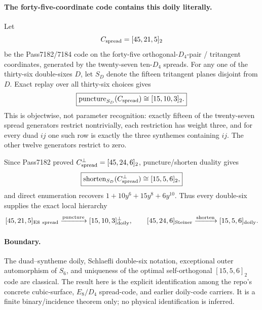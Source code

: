 \paragraph{The forty-five-coordinate code contains this doily literally.}
Let
\[
 C_{\rm spread}=[45,21,5]_2
\]
be the Pass7182/7184 code on the forty-five orthogonal-$D_4$-pair / tritangent coordinates, generated by the twenty-seven ten-$D_4$ spreads.  For any one of the thirty-six double-sixes $D$, let $S_D$ denote the fifteen tritangent planes disjoint from $D$.  Exact replay over all thirty-six choices gives
\[
 \boxed{\operatorname{puncture}_{S_D}(C_{\rm spread})\cong[15,10,3]_2.}
\]
This is objectwise, not parameter recognition: exactly fifteen of the twenty-seven spread generators restrict nontrivially, each restriction has weight three, and for every duad $ij$ one such row is exactly the three synthemes containing $ij$.  The other twelve generators restrict to zero.

Since Pass7182 proved $C_{\rm spread}^{\perp}=[45,24,6]_2$, puncture/shorten duality gives
\[
 \boxed{
 \operatorname{shorten}_{S_D}(C_{\rm spread}^{\perp})
 \cong[15,5,6]_2,
 }
\]
and direct enumeration recovers $1+10y^6+15y^8+6y^{10}$.  Thus every double-six supplies the exact local hierarchy
\[
 [45,21,5]_{\rm E8\ spread}
 \xrightarrow{\rm puncture}
 [15,10,3]_{\rm doily}^{\perp},
 \qquad
 [45,24,6]_{\rm Steiner}
 \xrightarrow{\rm shorten}
 [15,5,6]_{\rm doily}.
\]

\paragraph{Boundary.}
The duad--syntheme doily, Schlaefli double-six notation, exceptional outer automorphism of $S_6$, and uniqueness of the optimal self-orthogonal $[15,5,6]_2$ code are classical.  The result here is the explicit identification among the repo's concrete cubic-surface, $E_8/D_4$ spread-code, and earlier doily-code carriers.  It is a finite binary/incidence theorem only; no physical identification is inferred.
